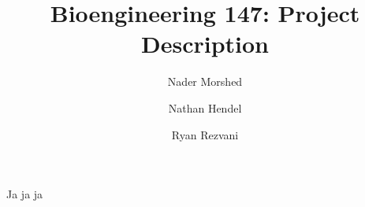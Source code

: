 \documentclass{article}
\title{Bioengineering 147: Project Description}
\author{Nader Morshed \and Nathan Hendel \and Ryan Rezvani}
\begin{document}
\maketitle
\thispagestyle{empty}
\pagestyle{empty}

Ja ja ja

\printbibliography
\end{document}
